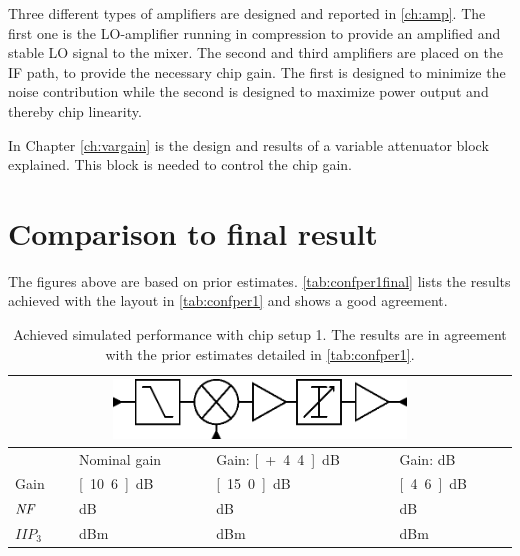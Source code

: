 		Three different types of amplifiers are designed and reported in \autoref{ch:amp}. The first one is the LO-amplifier running in compression to provide an amplified and stable LO signal to the mixer. The second and third amplifiers are placed on the IF path, to provide the necessary chip gain. The first is designed to minimize the noise contribution while the second is designed to maximize power output and thereby chip linearity.

		In Chapter \ref{ch:vargain} is the design and results of a variable attenuator block explained. This block is needed to control the chip gain.

	\newpage
	\section{Comparison to final result}
		The figures above are based on prior estimates. \autoref{tab:confper1final} lists the results achieved with the layout in \autoref{tab:confper1} and shows a good agreement.

		\begin{table}[hpt!]
			\caption[Achieved simulated performance with chip setup 1.]{Achieved simulated performance with chip setup 1. The results are in agreement with the prior estimates detailed in \autoref{tab:confper1}.}
			\label{tab:confper1final}
			\centering
			\begin{tabular}{ l l l l }
				\multicolumn{4}{c}{\includegraphics[width=0.6\textwidth]{fig/system/sys1}} \\\toprule
				& Nominal gain & Gain: \unit[+4.4]{dB} & Gain: \unit[-6]{dB} \\\midrule
				Gain & \unit[10.6]{dB} & \unit[15.0]{dB} & \unit[4.6]{dB} \\
				$\emph{NF}$ & \unit[11]{dB} & \unit[10]{dB} & \unit[13]{dB} \\
				$IIP_3$ & \unit[20]{dBm} & \unit[17]{dBm} & \unit[21]{dBm}  \\\bottomrule
			\end{tabular}
		\end{table}
